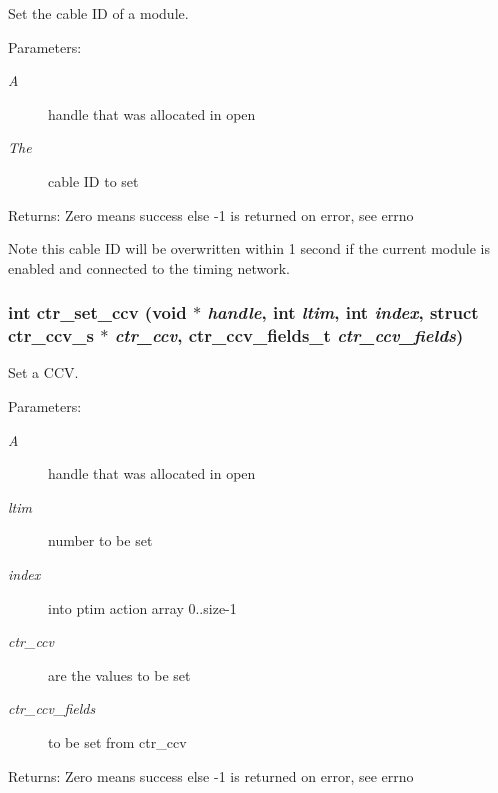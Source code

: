 Set the cable ID of a module. 

\begin{Desc}
\item[Parameters:]
\begin{description}
\item[{\em A}]handle that was allocated in open \item[{\em The}]cable ID to set \end{description}
\end{Desc}
\begin{Desc}
\item[Returns:]Zero means success else -1 is returned on error, see errno\end{Desc}
Note this cable ID will be overwritten within 1 second if the current module is enabled and connected to the timing network. 
\subsubsection{\setlength{\rightskip}{0pt plus 5cm}int ctr\_\-set\_\-ccv (void $\ast$ {\em handle}, int {\em ltim}, int {\em index}, struct \bf{ctr\_\-ccv\_\-s} $\ast$ {\em ctr\_\-ccv}, \bf{ctr\_\-ccv\_\-fields\_\-t} {\em ctr\_\-ccv\_\-fields})}\label{libctr_8doxygen_62d1d686d7be3a72fa518149d1e9ee2b}


Set a CCV. 

\begin{Desc}
\item[Parameters:]
\begin{description}
\item[{\em A}]handle that was allocated in open \item[{\em ltim}]number to be set \item[{\em index}]into ptim action array 0..size-1 \item[{\em ctr\_\-ccv}]are the values to be set \item[{\em ctr\_\-ccv\_\-fields}]to be set from ctr\_\-ccv \end{description}
\end{Desc}
\begin{Desc}
\item[Returns:]Zero means success else -1 is returned on error, see errno \end{Desc}
